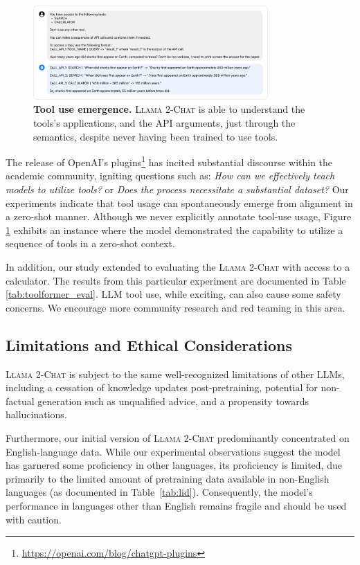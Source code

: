 \documentclass{article}
\newcommand{\modelname}{\textsc{Llama 2-Chat}\xspace}
\begin{document}
\begin{figure}[htbp]
\centering
\includegraphics[width=0.8\textwidth]{img/figure22.pdf}
\caption{\textbf{Tool use emergence.} \modelname is able to understand the tools's applications, and the API arguments, just through the semantics, despite never having been trained to use tools.}
\label{fig:example_tool_use}
\end{figure}

The release of OpenAI's plugins\footnote{\url{https://openai.com/blog/chatgpt-plugins}} has incited substantial discourse within the academic community, igniting questions such as: \emph{How can we effectively teach models to utilize tools?} or \emph{Does the process necessitate a substantial dataset?} Our experiments indicate that tool usage can spontaneously emerge from alignment in a zero-shot manner. Although we never explicitly annotate tool-use usage, Figure \ref{fig:example_tool_use} exhibits an instance where the model demonstrated the capability to utilize a sequence of tools in a zero-shot context.

In addition, our study extended to evaluating the \modelname{} with access to a calculator. The results from this particular experiment are documented in Table \ref{tab:toolformer_eval}. LLM tool use, while exciting, can also cause some safety concerns. We encourage more community research and red teaming in this area.

\subsection{Limitations and Ethical Considerations}
\label{sec:limitations}

\modelname{} is subject to the same well-recognized limitations of other LLMs, including a cessation of knowledge updates post-pretraining, potential for non-factual generation such as unqualified advice, and a propensity towards hallucinations.

Furthermore, our initial version of \modelname{} predominantly concentrated on English-language data. While our experimental observations suggest the model has garnered some proficiency in other languages, its proficiency is limited, due primarily to the limited amount of pretraining data available in non-English languages (as documented in Table~\ref{tab:lid}). Consequently, the model's performance in languages other than English remains fragile and should be used with caution.
\end{document}
